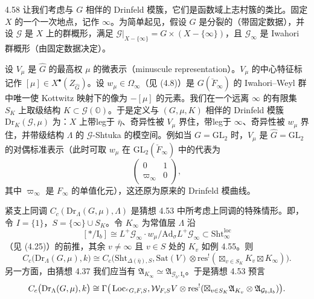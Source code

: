 \begin{exam}{4.58}\label{thm:a2-4-58}
让我们考虑与 $G$ 相伴的 Drinfeld 模簇，它们是函数域上志村簇的类比。固定 $X$ 的一个一次地点，记作 $\infty$。为简单起见，假设 $G$ 是分裂的（带固定数据），并设 $\mathcal G$ 是 $X$ 上的群概形，满足 $\mathcal G|_{X-\{\infty\}}=G\times(X-\{\infty\})$，且 $\mathcal G_\infty$ 是 Iwahori 群概形（由固定数据决定）。

设 $V_\mu$ 是 $\hat G$ 的最高权 $\mu$ 的微表示（minuscule representation）。$V_\mu$ 的中心特征标记作 $[\mu]\in X^{\bullet}(Z_{\hat G})$。设 $w_\mu\in\Omega_\infty$（见 (4.8)）是 $G(\breve F_\infty)$ 的 Iwahori–Weyl 群中唯一使 Kottwitz 映射下的像为 $-[\mu]$ 的元素。我们在一个远离 $\infty$ 的有限集 $S_K$ 上取级结构 $K\subset\mathcal G(\mathbb O)$。于是定义与 $(G,\mu,K)$ 相伴的 Drinfeld 模簇 $\mathrm{Dr}_K(\mathcal G,\mu)$ 为：$X$ 上带leg于 $\bar\eta$、奇异性被 $V_\mu$ 界住，带leg于 $\infty$、奇异性被 $w_\mu$ 界住，并带级结构 $\Lambda$ 的 $\mathcal G$-Shtuka 的模空间。例如当 $G=\mathrm{GL}_2$ 时，$V_\mu$ 是 $\hat G=\mathrm{GL}_2$ 的对偶标准表示（此时可取 $w_\mu$ 在 $\mathrm{GL}_2(\breve F_\infty)$ 中的代表为
\[
\begin{pmatrix}0&1\\ \varpi_\infty&0\end{pmatrix},
\]
其中 $\varpi_\infty$ 是 $F_\infty$ 的单值化元），这还原为原来的 Drinfeld 模曲线。

紧支上同调 $C_c(\mathrm{Dr}_\Lambda(G,\mu),\Lambda)$ 是猜想 4.53 中所考虑上同调的特殊情形。即，令 $I=\{1\}$，$S=\{\infty\}\cup S_K$。令 $K_\infty$ 为常值层 $\Lambda$ 沿
\[
[*/\mathrm{I}_b]\cong L^+\mathcal G_\infty\cdot w_\mu/\mathrm{Ad}_\sigma L^+\mathcal G_\infty\subset\mathrm{Sht}^{\mathrm{loc}}_\infty
\]
（见 (4.25)）的前推，其余 $v\ne\infty$ 且 $v\in S$ 处的 $K_v$ 如例 4.55。则
\[
C_c\big(\mathrm{Dr}_\Lambda(G,\mu),k\big)\cong C_c\big(\mathrm{Sht}_{\Delta(\bar\eta),S},\mathrm{Sat}(V)\otimes\mathrm{res}^!(\boxtimes_{v\in S_K}K_v\boxtimes K_\infty)\big).
\]
另一方面，由猜想 4.37 我们应当有 $\mathfrak A_{K_\infty}\simeq\mathfrak A_{\mathcal G_b,\mathrm{I}_b}$。于是猜想 4.53 预言
\[
C_c\big(\mathrm{Dr}_\Lambda(G,\mu),k\big)\cong\Gamma\big(\operatorname{Loc}_{{}^cG,F,S},\mathcal W_{F,S}V\otimes\mathrm{res}^!(\boxtimes_{v\in S_K}\mathfrak A_{K_v}\otimes\mathfrak A_{\mathcal G_b,\mathrm{I}_b})\big).
\]
\end{exam}

